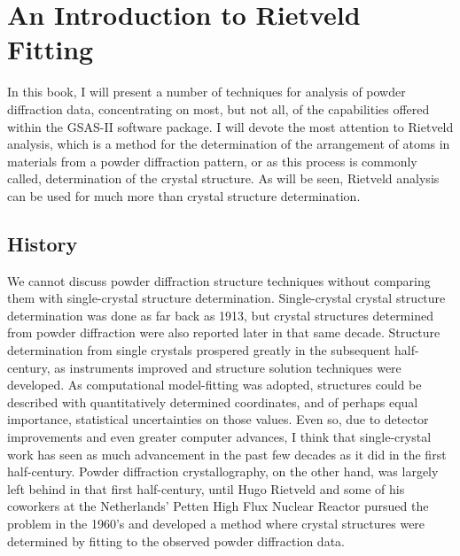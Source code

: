 
\chapter{An Introduction to Rietveld Fitting}

In this book, I will present a number of techniques for analysis of powder diffraction data, concentrating on most, but not all, of the capabilities offered within the GSAS-II software package. 
I will devote the most attention to Rietveld analysis, which is a method for the determination of the arrangement of atoms in materials from a powder diffraction pattern, or as this process is commonly called, determination of the crystal structure. As will be seen, Rietveld analysis can be used for much more than crystal structure determination. 

\section{History} 
We cannot discuss powder diffraction structure techniques without comparing them with single-crystal structure determination. Single-crystal crystal structure determination was done as far back as 1913, but crystal structures determined from powder diffraction were also reported later in that same decade. 
Structure determination from single crystals prospered greatly in the subsequent half-century, as instruments improved and structure solution techniques were developed. As computational model-fitting was adopted, structures could be described with quantitatively determined coordinates, and of perhaps equal importance, statistical uncertainties on those values. Even so, due to detector improvements and even greater computer advances, I think that single-crystal work has seen as much advancement in the past few decades as it did in the first half-century.
Powder diffraction crystallography, on the other hand, was largely left behind in that first half-century, until Hugo Rietveld and some of his coworkers at the Netherlands' Petten High Flux Nuclear Reactor pursued the problem in the 1960's and developed a method where crystal structures were determined by fitting to the observed powder diffraction data. 

